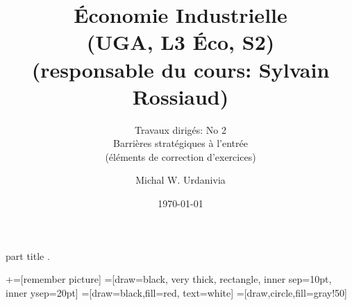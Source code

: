 
\usepackage{color}
\usepackage{tikz}


\usepackage{enumerate}   


%
  \usepackage{eso-pic}

{
    \begin{centering}
    \begin{beamercolorbox}[sep=11pt,center]{part title}
    \thesection.~\insertsection\par
    \end{beamercolorbox}
    \end{centering}
}
\title[]{ \textbf{Économie Industrielle} \\ (UGA, L3 Éco, S2) \\ (responsable du cours: Sylvain Rossiaud)}
\subtitle{Travaux dirigés: No 2\\ 
Barrières stratégiques à l'entrée\\(éléments de correction d'exercices)}
\date{\today}
\author{Michal W. Urdanivia\inst{*}}



\usetikzlibrary{positioning}
\usetikzlibrary{snakes}
\usetikzlibrary{calc}
\usetikzlibrary{arrows}
\usetikzlibrary{decorations.markings}
\usetikzlibrary{shapes.misc}
\usetikzlibrary{matrix,shapes,arrows,fit,tikzmark}
\usetikzlibrary{shapes}
\newcommand\marktopleft[1]{
    \tikz[overlay,remember picture] 
        \node (marker-#1-a) at (-.3em,.3em) {};%
}
\newcommand\markbottomright[2]{%
    \tikz[overlay,remember picture] 
        \node (marker-#1-b) at (0em,0em) {};%
}
+=[remember picture] 
 =[draw=black, very thick, rectangle, inner sep=10pt, inner ysep=20pt]
 =[draw=black,fill=red, text=white]
=[draw,circle,fill=gray!50]




